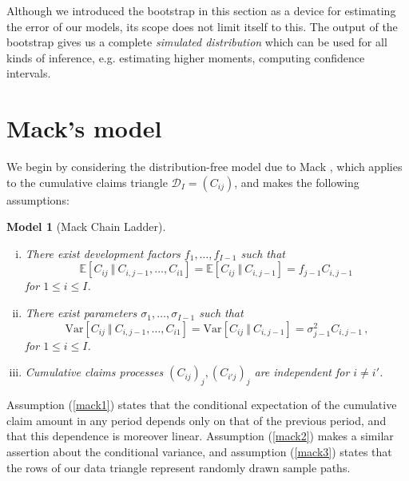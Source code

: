 \documentclass[a4paper]{book}
\theoremstyle{plain}
\newtheorem{model}{Model}
\begin{document}
Although we introduced the bootstrap in this section as a device for estimating the error of our models, its scope does not limit itself to this. The output of the bootstrap gives us a complete \emph{simulated distribution} which can be used for all kinds of inference, e.g. estimating higher moments, computing confidence intervals. 

\section{Mack's model}

We begin by considering the distribution-free model due to Mack , which applies to the cumulative claims triangle $\mathcal{D}_I = (C_{ij})$, and makes the following assumptions:
\begin{model}[Mack Chain Ladder] \label{model:mack} \leavevmode
    \begin{enumerate}[(i)]
        \item \label{mack1} There exist development factors $f_1, \dots, f_{I - 1}$ such that
        \begin{displaymath}
            \mathbb{E}[C_{ij} \ \Vert \ C_{i, j - 1}, \dots, C_{i1}] = \mathbb{E}[C_{ij} \ \Vert \ C_{i, j - 1}] = f_{j - 1} C_{i, j - 1}\,
        \end{displaymath}
        for $1 \leq i \leq I$.
        \item \label{mack2} There exist parameters $\sigma_1, \dots, \sigma_{I - 1}$ such that
        \begin{displaymath}
            \mathrm{Var}[C_{ij} \ \Vert \ C_{i, j - 1}, \dots, C_{i1}] = \mathrm{Var}[C_{ij} \ \Vert \ C_{i, j - 1}] = \sigma_{j - 1}^2 C_{i, j - 1}\,,
        \end{displaymath}
        for $1 \leq i \leq I$.
        \item \label{mack3} Cumulative claims processes $(C_{ij})_j, (C_{i'j})_j$ are independent for $i \neq i'$.
    \end{enumerate}
\end{model}
Assumption (\ref{mack1}) states that the conditional expectation of the cumulative claim amount in any period depends only on that of the previous period, and that this dependence is moreover linear. Assumption (\ref{mack2}) makes a similar assertion about the conditional variance, and assumption (\ref{mack3}) states that the rows of our data triangle represent randomly drawn sample paths.
\end{document}
